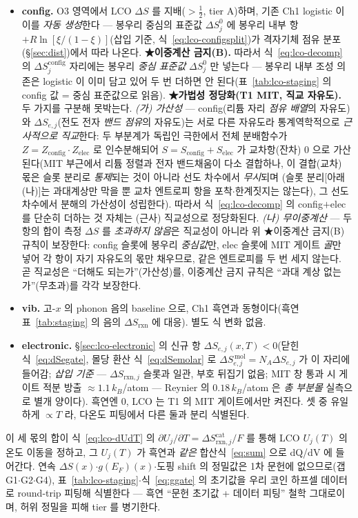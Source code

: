 \documentclass[11pt,a4paper]{article}
\newcommand{\rxn}{\mathrm{rxn}}
\begin{document}
\begin{itemize}[leftmargin=1.4em,itemsep=2pt]
\item \textbf{config.} O3 영역에서 LCO $\Delta S$ 를 지배($>\tfrac12$\cite{reynier2004}, tier A)하며, 기존 Ch1 logistic 이 이를
\emph{자동 생성}한다 — 봉우리 중심의 표준값 $\Delta S_j^0$ 에 봉우리 내부 항 $+R\ln[\xi/(1-\xi)]$(삽입 기준,
식~\eqref{eq:lco-configsplit})가 격자기체 점유 분포(\S\ref{sec:dist})에서 따라 나온다. \textbf{★이중계산 금지(B).} 따라서 식~\eqref{eq:lco-decomp} 의
$\Delta S_j^\mathrm{config}$ 자리에는 봉우리 \emph{중심 표준값} $\Delta S_j^0$ 만 넣는다 — 봉우리 내부 조성 의존은
logistic 이 이미 담고 있어 두 번 더하면 안 된다(표~\ref{tab:lco-staging} 의 config 값 = 중심 표준값으로 읽음).
\textbf{★가법성 정당화(T1 MIT, 직교 자유도).} 두 가지를 구분해 못박는다. \emph{(가) 가산성} — config(리튬 자리
\emph{점유 배열}의 자유도)와 $\Delta S_{e,j}$(전도 전자 \emph{밴드 점유}의 자유도)는 서로 다른 자유도라 통계역학적으로
\emph{근사적으로 직교}한다: 두 부분계가 독립인 극한에서 전체 분배함수가 $Z=Z_\mathrm{config}\!\cdot\!Z_\mathrm{elec}$ 로
인수분해되어 $S=S_\mathrm{config}+S_\mathrm{elec}$ 가 교차항(잔차) $0$ 으로 가산된다(MIT 부근에서 리튬 정렬과 전자
밴드채움이 다소 결합하나, 이 결합(교차) 몫은 슬롯 분리로 \emph{통제}되는 것이 아니라 선도 차수에서 \emph{무시}되며
(슬롯 분리[아래 (나)]는 과대계상만 막을 뿐 교차 엔트로피 항을 포착$\cdot$한계짓지는 않는다), 그 선도 차수에서 분해의
가산성이 성립한다). 따라서 식~\eqref{eq:lco-decomp} 의 config$+$elec 를 단순히 더하는 것 자체는 (근사) 직교성으로 정당화된다. \emph{(나) 무이중계산} — 두 항의 합이 측정
$\Delta S$ 를 \emph{초과하지 않음}은 직교성이 아니라 위 ★이중계산 금지(B) 규칙이 보장한다: config 슬롯에 봉우리
\emph{중심값}만, elec 슬롯에 MIT 게이트 \emph{골}만 넣어 각 항이 자기 자유도의 몫만 채우므로, 같은 엔트로피를 두 번
세지 않는다. 곧 직교성은 ``더해도 되는가''(가산성)를, 이중계산 금지 규칙은 ``과대 계상 없는가''(무초과)를 각각 보장한다.
\item \textbf{vib.} 고-$x$ 의 phonon 음의 baseline 으로, Ch1 흑연과 동형이다(흑연 표~\ref{tab:staging} 의 음의
$\Delta S_\rxn$ 에 대응). 별도 식 변화 없음.
\item \textbf{electronic.} \S\ref{sec:lco-electronic} 의 신규 항 $\Delta S_{e,j}(x,T)<0$(닫힌식~\eqref{eq:dSegate},
몰당 환산 식~\eqref{eq:dSemolar} 로 $\Delta S_{e,j}^{\,\mathrm{mol}}=N_A\Delta S_{e,j}$ 가 이 자리에 들어감; \emph{삽입
기준} — $\Delta S_{\rxn,j}$ 슬롯과 일관, 부호 뒤집기 없음; MIT 창 통과 시 게이트 적분 방출 $\approx1.1\,k_B$/atom —
Reynier 의 $0.18\,k_B$/atom 은 \emph{총 부분몰} 실측으로 별개 양이다).
흑연엔 0, LCO 는 T1 의 MIT 게이트에서만 켜진다. 셋 중 유일하게 $\propto T$ 라, 다온도 피팅에서 다른 둘과 분리 식별된다.
\end{itemize}
이 세 몫의 합이 식~\eqref{eq:lco-dUdT} 의 $\partial U_j/\partial T=\Delta S_{\rxn,j}^\mathrm{cat}/F$ 를 통해 LCO
$U_j(T)$ 의 온도 이동을 정하고, 그 $U_j(T)$ 가 흑연과 \emph{같은} 합산식~\eqref{eq:sum} 으로 dQ/dV 에 들어간다.
연속 $\Delta S(x)$$\cdot$$g(E_F)(x)$$\cdot$도핑 shift 의 정밀값은 1차 문헌에 없으므로(갭 G1$\cdot$G2$\cdot$G4),
표~\ref{tab:lco-staging}$\cdot$식~\eqref{eq:ggate} 의 초기값을 우리 코인 하프셀 데이터로 round-trip 피팅해 식별한다
— 흑연 ``문헌 초기값 + 데이터 피팅'' 철학 그대로이며, 허위 정밀을 피해 tier 를 병기한다.
\end{document}
